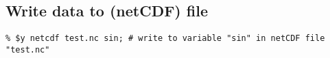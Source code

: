 \subsection{Write data to (netCDF) file}
      \label{demo-ooc-write}

    \begin{verbatim}
% $y netcdf test.nc sin; # write to variable "sin" in netCDF file "test.nc"
\end{verbatim}

